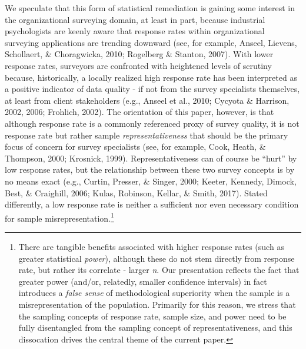 \documentclass[
  ,man,floatsintext]{apa6}
\begin{document}
We speculate that this form of statistical remediation is gaining some interest in the organizational surveying domain, at least in part, because industrial psychologists are keenly aware that response rates within organizational surveying applications are trending downward (see, for example, Anseel, Lievens, Schollaert, \& Choragwicka, 2010; Rogelberg \& Stanton, 2007). With lower response rates, surveyors are confronted with heightened levels of scrutiny because, historically, a locally realized high response rate has been interpreted as a positive indicator of data quality - if not from the survey specialists themselves, at least from client stakeholders (e.g., Anseel et al., 2010; Cycyota \& Harrison, 2002, 2006; Frohlich, 2002). The orientation of this paper, however, is that although response rate is a commonly referenced proxy of survey quality, it is not response rate but rather sample \emph{representativeness} that should be the primary focus of concern for survey specialists (see, for example, Cook, Heath, \& Thompson, 2000; Krosnick, 1999). Representativeness can of course be ``hurt'' by low response rates, but the relationship between these two survey concepts is by no means exact (e.g., Curtin, Presser, \& Singer, 2000; Keeter, Kennedy, Dimock, Best, \& Craighill, 2006; Kulas, Robinson, Kellar, \& Smith, 2017). Stated differently, a low response rate is neither a sufficient nor even necessary condition for sample misrepresentation.\footnote{There are tangible benefits associated with higher response rates (such as greater statistical \emph{power}), although these do not stem directly from response rate, but rather its correlate - larger \emph{n}. Our presentation reflects the fact that greater power (and/or, relatedly, smaller confidence intervals) in fact introduces a \emph{false sense} of methodological superiority when the sample is a misrepresentation of the population. Primarily for this reason, we stress that the sampling concepts of response rate, sample size, and power need to be fully disentangled from the sampling concept of representativeness, and this dissocation drives the central theme of the current paper.}
\end{document}
